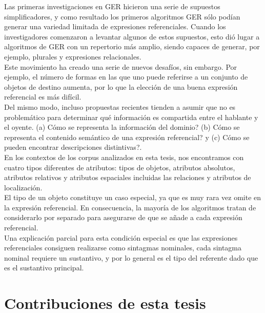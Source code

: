 Las primeras investigaciones en GER hicieron una serie de supuestos simplificadores, y como resultado los primeros
algoritmos GER s\'olo pod\'ian generar una variedad limitada de expresiones referenciales. Cuando
los investigadores comenzaron a levantar algunos de estos supuestos, esto di\'o lugar a algoritmos de GER
con un repertorio m\'as amplio, siendo capaces de generar, por ejemplo, plurales y expresiones relacionales. \\

Este movimiento ha creado una serie de nuevos desaf\'ios, sin embargo. Por ejemplo, el
n\'umero de formas en las que uno puede referirse a un conjunto de objetos de destino aumenta, por lo que la elecci\'on de una
buena expresi\'on referencial es m\'as dif\'icil.\\

Del mismo modo, incluso propuestas recientes tienden a asumir que no es problem\'atico para determinar qu\'e informaci\'on
es compartida entre el hablante y el oyente.
 (a) C\'omo se representa la informaci\'on del dominio?
(b) C\'omo se representa el contenido sem\'antico de una expresi\'on referencial? y (c) C\'omo se pueden encontrar descripciones distintivas?.\\

 En los contextos de los corpus analizados en esta tesis, nos encontramos con cuatro tipos diferentes de atributos:
tipos de objetos, atributos absolutos, atributos relativos y atributos espaciales incluidas las relaciones y atributos de localizaci\'on.\\

El tipo de un objeto constituye un caso especial, ya que es muy rara vez omite
en la expresi\'on referencial. En consecuencia, la mayor\'ia de los algoritmos tratan de
considerarlo por separado para asegurarse de que se a\~nade a cada expresi\'on referencial. \\

Una explicaci\'on parcial para esta condici\'on especial es que las expresiones referenciales consiguen realizarse como sintagmas nominales,
cada sintagma nominal requiere un sustantivo, y por lo general es el tipo del referente dado que es el sustantivo principal.\\

\section{Contribuciones de esta tesis}
\label{sec:contribiciones}


